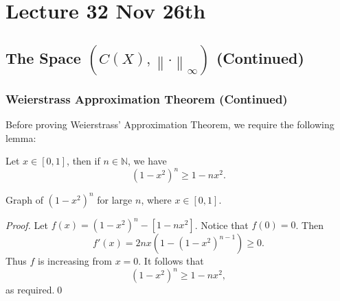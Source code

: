 \documentclass[notoc,notitlepage]{tufte-book}
\newcommand{\norm}[1]{\left\| #1 \right\|}
\begin{document}
\chapter{Lecture 32 Nov 26th}%
\label{chp:lecture_32_nov_26th}

\section{The Space $(C(X), \norm\cdot_\infty)$ (Continued)}%
\label{sec:the_space_c_x_normcdot_infty_continued}

\subsection{Weierstrass Approximation Theorem (Continued)}%
\label{sub:weierstrass_approximation_theorem_continued}

Before proving Weierstrass' Approximation Theorem, we require the following lemma:

\begin{lemma}\label{lemma:lemma_for_weierstrass_approximation}
  Let $x \in [0, 1]$, then if $n \in \mathbb{N}$, we have
  \begin{equation*}
    (1 - x^2)^n \geq 1 - nx^2.
  \end{equation*}
  \begin{marginfigure}
    \centering
    \caption{Graph of $(1 - x^2)^n$ for large $n$, where $x \in [0, 1]$.}\label{fig:graph_of_1_x_2_n_for_large_n_where_x_in_0_1_}
  \end{marginfigure}
\end{lemma}

\begin{proof}
  Let $f(x) = (1 - x^2)^n - [ 1 - nx^2 ]$. Notice that $f(0) = 0$. Then
  \begin{equation*}
    f'(x) = 2nx\left( 1 - \left( 1 - x^2 \right)^{n - 1} \right) \geq 0.
  \end{equation*}
  Thus $f$ is increasing from $x = 0$. It follows that
  \begin{equation*}
    (1 - x^2)^n \geq 1 - nx^2,
  \end{equation*}
  as required.\qed\
\end{proof}
\end{document}
